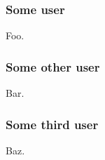 
\subsubsection{Some user}
Foo.
\subsubsection{Some other user}
Bar.
\subsubsection{Some third user}
Baz.
